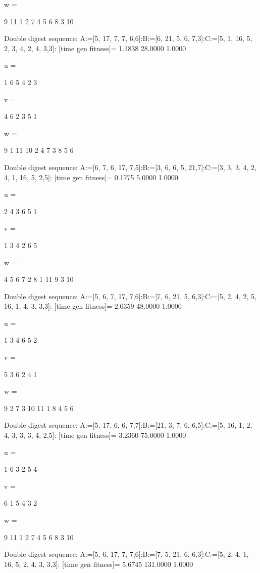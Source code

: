 w =

     9    11     1     2     7     4     5     6     8     3    10

Double digest sequence:
A:=[5, 17, 7, 7, 6,6]:B:=[6, 21, 5, 6, 7,3]:C:=[5, 1, 16, 5, 2, 3, 4, 2, 4, 3,3]:
[time gen fitness]=
    1.1838   28.0000    1.0000


u =

     1     6     5     4     2     3


v =

     4     6     2     3     5     1


w =

     9     1    11    10     2     4     7     3     8     5     6

Double digest sequence:
A:=[6, 7, 6, 17, 7,5]:B:=[3, 6, 6, 5, 21,7]:C:=[3, 3, 3, 4, 2, 4, 1, 16, 5, 2,5]:
[time gen fitness]=
    0.1775    5.0000    1.0000


u =

     2     4     3     6     5     1


v =

     1     3     4     2     6     5


w =

     4     5     6     7     2     8     1    11     9     3    10

Double digest sequence:
A:=[5, 6, 7, 17, 7,6]:B:=[7, 6, 21, 5, 6,3]:C:=[5, 2, 4, 2, 5, 16, 1, 4, 3, 3,3]:
[time gen fitness]=
    2.0359   48.0000    1.0000


u =

     1     3     4     6     5     2


v =

     5     3     6     2     4     1


w =

     9     2     7     3    10    11     1     8     4     5     6

Double digest sequence:
A:=[5, 17, 6, 6, 7,7]:B:=[21, 3, 7, 6, 6,5]:C:=[5, 16, 1, 2, 4, 3, 3, 3, 4, 2,5]:
[time gen fitness]=
    3.2360   75.0000    1.0000


u =

     1     6     3     2     5     4


v =

     6     1     5     4     3     2


w =

     9    11     1     2     7     4     5     6     8     3    10

Double digest sequence:
A:=[5, 6, 17, 7, 7,6]:B:=[7, 5, 21, 6, 6,3]:C:=[5, 2, 4, 1, 16, 5, 2, 4, 3, 3,3]:
[time gen fitness]=
    5.6745  131.0000    1.0000


